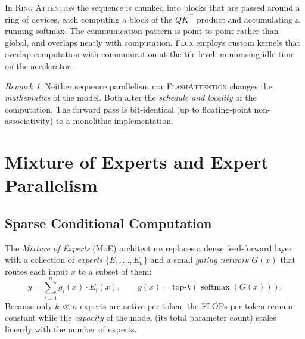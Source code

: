 \documentclass[11pt,a4paper]{article}
\theoremstyle{definition}
\theoremstyle{remark}
\newtheorem*{remark}{Remark}
\theoremstyle{plain}
\DeclareMathOperator{\softmax}{softmax}
\begin{document}
In \textsc{Ring Attention} the sequence is chunked into blocks that are
passed around a ring of devices, each computing a block of the $QK^\top$
product and accumulating a running softmax. The communication pattern is
point-to-point rather than global, and overlaps neatly with computation.
\textsc{Flux} employs custom kernels that overlap computation with
communication at the tile level, minimising idle time on the accelerator.

\begin{remark}
Neither sequence parallelism nor \textsc{FlashAttention} changes the
\emph{mathematics} of the model. Both alter the \emph{schedule and
locality} of the computation. The forward pass is bit-identical (up to
floating-point non-associativity) to a monolithic implementation.
\end{remark}

\section{Mixture of Experts and Expert Parallelism}

\subsection{Sparse Conditional Computation}

The \emph{Mixture of Experts} (MoE) architecture replaces a dense
feed-forward layer with a collection of \emph{experts}
$\{E_1, \ldots, E_n\}$ and a small \emph{gating network} $G(x)$ that
routes each input $x$ to a subset of them:
\begin{equation}
y = \sum_{i=1}^{n} g_i(x) \cdot E_i(x),
\qquad
g(x) = \mathrm{top}\text{-}k\!\left(\softmax(G(x))\right).
\end{equation}
Because only $k \ll n$ experts are active per token, the FLOPs per token
remain constant while the \emph{capacity} of the model (its total
parameter count) scales linearly with the number of experts.
\end{document}
